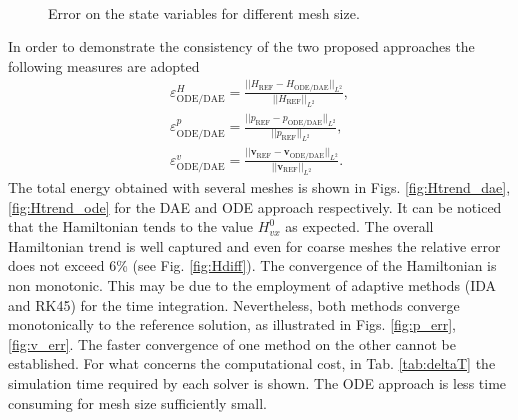 \begin{figure}[ht]%
	\centering
	\hspace{8pt}%
	 \\
	\caption[]{Error on the state variables for different mesh size.}%
	\label{fig:error_x}%
\end{figure}

In order to demonstrate the consistency of the two proposed approaches the following measures are adopted
\begin{align*}
\varepsilon^{H}_{\text{ODE}/\text{DAE}} = \frac{||H_{\text{REF}} - H_{\text{ODE}/\text{DAE}} ||_{L^2}}{||H_{\text{REF}}||_{L^2}}, \\
\varepsilon^p_{\text{ODE}/\text{DAE}} = \frac{||p_{\text{REF}} - p_{\text{ODE}/\text{DAE}} ||_{L^2}}{||p_{\text{REF}}||_{L^2}}, \\
\varepsilon^v_{\text{ODE}/\text{DAE}} = \frac{||\bm{v}_{\text{REF}} - \bm{v}_{\text{ODE}/\text{DAE}} ||_{L^2}}{||\bm{v}_{\text{REF}}||_{L^2}}. 
\end{align*}
The total energy obtained with several meshes is shown in Figs. \ref{fig:Htrend_dae}, \ref{fig:Htrend_ode} for the DAE and ODE approach respectively. It can be noticed that the Hamiltonian tends to the value $H_{vx}^0$ as expected. The overall Hamiltonian trend is well captured and even for coarse meshes the relative error does not exceed 6\% (see Fig. \ref{fig:Hdiff}). The convergence of the Hamiltonian is non monotonic. This may be due to the employment of adaptive methods (IDA and RK45) for the time integration. Nevertheless, both methods converge monotonically to the reference solution, as illustrated in Figs. \ref{fig:p_err}, \ref{fig:v_err}. The faster convergence of one method on the other cannot be established. For what concerns the computational cost, in Tab. \ref{tab:deltaT} the simulation time required by each solver is shown. The ODE approach is less time consuming for mesh size sufficiently small.

